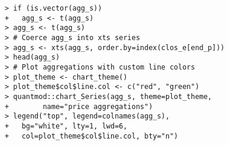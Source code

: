 \documentclass[10pt]{beamer}\usepackage[]{graphicx}\usepackage[]{color}
\makeatletter
\newenvironment{kframe}{%
 \def\at@end@of@kframe{}%
 \ifinner\ifhmode%
  \def\at@end@of@kframe{\end{minipage}}%
  \begin{minipage}{\columnwidth}%
 \fi\fi%
 \def\FrameCommand##1{\hskip\@totalleftmargin \hskip-\fboxsep
 \colorbox{shadecolor}{##1}\hskip-\fboxsep
     \hskip-\linewidth \hskip-\@totalleftmargin \hskip\columnwidth}%
 \MakeFramed {\advance\hsize-\width
   \@totalleftmargin\z@ \linewidth\hsize
   \@setminipage}}%
 {\par\unskip\endMakeFramed%
 \at@end@of@kframe}
\newenvironment{knitrout}{}{} %
\makeatother
\begin{document}
\begin{frame}[fragile,t]{\subsecname}
\begin{block}{}
\begin{columns}[T]
\begin{knitrout}
\begin{kframe}
\begin{verbatim}
> if (is.vector(agg_s))
+   agg_s <- t(agg_s)
> agg_s <- t(agg_s)
> # Coerce agg_s into xts series
> agg_s <- xts(agg_s, order.by=index(clos_e[end_p]))
> head(agg_s)
> # Plot aggregations with custom line colors
> plot_theme <- chart_theme()
> plot_theme$col$line.col <- c("red", "green")
> quantmod::chart_Series(agg_s, theme=plot_theme,
+        name="price aggregations")
> legend("top", legend=colnames(agg_s),
+   bg="white", lty=1, lwd=6,
+   col=plot_theme$col$line.col, bty="n")
\end{verbatim}
\end{kframe}
\end{knitrout}
  \end{columns}
\end{block}

\end{frame}


\end{document}
